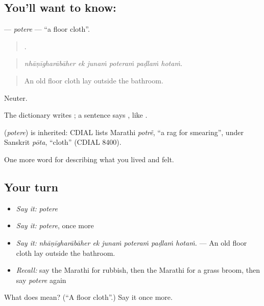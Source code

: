 \subsection*{You'll want to know: }
\textbf{} — \emph{potere} — \textquotedblleft{}a floor cloth\textquotedblright{}.

\begin{quote}
     .
\end{quote}

\begin{quote}
\emph{nhāṇīgharābāher ek junaṁ poteraṁ paḍlaṁ hotaṁ.}
\end{quote}

\begin{quote}
An old floor cloth lay outside the bathroom.
\end{quote}

Neuter.

The dictionary writes ; a sentence says , like .

\begin{cousinweb}
\textbf{} (\emph{potere}) is inherited: CDIAL lists Marathi \emph{potrẽ}, \textquotedblleft{}a rag for smearing\textquotedblright{}, under Sanskrit \emph{pōta}, \textquotedblleft{}cloth\textquotedblright{} (CDIAL 8400).
\end{cousinweb}

\begin{grammarlens}[title={What you've built}]
One more word for describing what you lived and felt.
\end{grammarlens}

\subsection*{Your turn}
\begin{itemize}
\raggedright
  \item \emph{Say it:} \emph{potere}
  \item \emph{Say it:} \emph{potere}, once more
  \item \emph{Say it:} \emph{nhāṇīgharābāher ek junaṁ poteraṁ paḍlaṁ hotaṁ.} — An old floor cloth lay outside the bathroom.
  \item \emph{Recall:} say the Marathi for rubbish, then the Marathi for a grass broom, then say \emph{potere} again
\end{itemize}

\begin{tcolorbox}[breakable,colback=teal!4,colframe=teal!35!black,title={Before you move on}]
What does  mean? (\textquotedblleft{}A floor cloth\textquotedblright{}.) Say it once more.
\end{tcolorbox}
